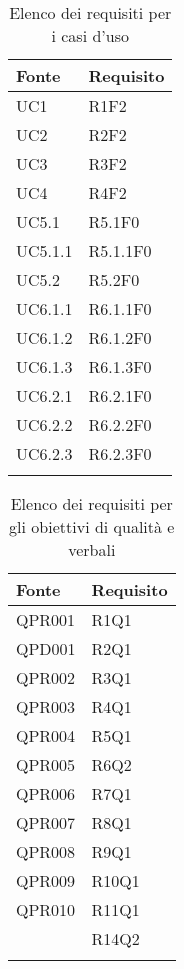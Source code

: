 		\begin{table}[H]
			\centering
			{\def\arraystretch{1.5}
			\begin{tabularx}{\textwidth}{YY}
				\textbf{Fonte} & \textbf{Requisito} \\				
				\toprule
				UC1 & R1F2 \\
				UC2 & R2F2 \\
				UC3 & R3F2 \\
				UC4 & R4F2 \\
				UC5.1 & R5.1F0 \\
				UC5.1.1 & R5.1.1F0 \\
				UC5.2 & R5.2F0 \\
				UC6.1.1 & R6.1.1F0 \\
				UC6.1.2 & R6.1.2F0 \\
				UC6.1.3 & R6.1.3F0 \\
				UC6.2.1 & R6.2.1F0 \\
				UC6.2.2 & R6.2.2F0 \\
				UC6.2.3 & R6.2.3F0 \\
				\bottomrule \\
			\end{tabularx}}
			\caption{Elenco dei requisiti per i casi d'uso}
		\end{table}
	
		\begin{table}[H]
		\centering
		{\def\arraystretch{1.5}
		\begin{tabularx}{\textwidth}{YY}
			\textbf{Fonte} & \textbf{Requisito} \\				
			\toprule
			QPR001 & R1Q1 \\
			QPD001 & R2Q1 \\
			QPR002 & R3Q1 \\
			QPR003 & R4Q1 \\
			QPR004 & R5Q1 \\
			QPR005 & R6Q2 \\
			QPR006 & R7Q1 \\
			QPR007 & R8Q1 \\
			QPR008 & R9Q1 \\
			QPR009 & R10Q1 \\
			QPR010 & R11Q1 \\
			 & R14Q2 \\
			\bottomrule\\
		\end{tabularx}}
		\caption{Elenco dei requisiti per gli obiettivi di qualità e verbali}
	\end{table}
		
